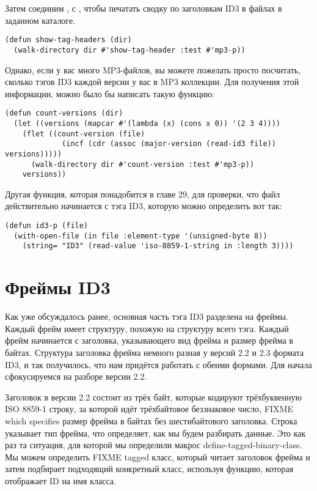 Затем соединим ,  с , чтобы
печатать сводку по заголовкам ID3 в файлах в заданном каталоге.

\begin{lstlisting}
(defun show-tag-headers (dir) 
  (walk-directory dir #'show-tag-header :test #'mp3-p))
\end{lstlisting}

Однако, если у вас много MP3-файлов, вы можете пожелать просто посчитать, сколько тэгов
ID3 каждой версии у вас в MP3 коллекции.  Для получения этой информации, можно было бы
написать такую функцию:

\begin{lstlisting}
(defun count-versions (dir)
  (let ((versions (mapcar #'(lambda (x) (cons x 0)) '(2 3 4))))
    (flet ((count-version (file)
             (incf (cdr (assoc (major-version (read-id3 file)) versions)))))
      (walk-directory dir #'count-version :test #'mp3-p))
    versions))
\end{lstlisting}

Другая функция, которая понадобится в главе 29, для проверки, что файл действительно
начинается с тэга ID3, которую можно определить вот так:

\begin{lstlisting}
(defun id3-p (file)
  (with-open-file (in file :element-type '(unsigned-byte 8))
    (string= "ID3" (read-value 'iso-8859-1-string in :length 3))))
\end{lstlisting}

\section{Фреймы ID3}

Как уже обсуждалось ранее, основная часть тэга ID3 разделена на фреймы.  Каждый фрейм
имеет структуру, похожую на структуру всего тэга.  Каждый фрейм начинается с заголовка,
указывающего вид фрейма и размер фрейма в байтах.  Структура заголовка фрейма немного
разная у версий 2.2 и 2.3 формата ID3, и так получилось, что нам придётся работать с
обеими формами. Для начала сфокусируемся на разборе версии 2.2.

Заголовок в версии 2.2 состоит из трёх байт, которые кодируют трёхбуквенную ISO 8859-1
строку, за которой идёт трёхбайтовое беззнаковое число, FIXME which specifies размер
фрейма в байтах без шестибайтового заголовка.  Строка указывает тип фрейма, что
определяет, как мы будем разбирать данные.  Это как раз та ситуация, для которой мы
определили макрос define-tagged-binary-class.  Мы можем определить FIXME tagged класс,
который читает заголовок фрейма и затем подбирает подходящий конкретный класс, используя
функцию, которая отображает ID на имя класса.

